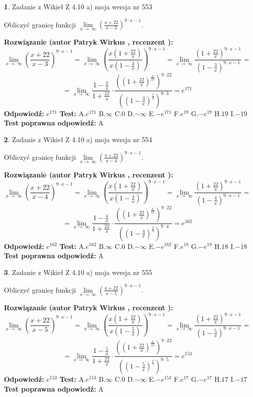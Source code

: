 \documentclass[12pt, a4paper]{article}
\theoremstyle{definition} %
\newtheorem{zad}{}
\newcommand{\zadStart}[1]{\begin{zad}#1\newline}
\newcommand{\zadStop}{\end{zad}}
\newcommand{\rozwStart}[2]{\noindent \textbf{Rozwiązanie (autor #1 , recenzent #2): }\newline}
\newcommand{\rozwStop}{\newline}
\newcommand{\odpStart}{\noindent \textbf{Odpowiedź:}\newline}
\newcommand{\odpStop}{\newline}
\newcommand{\testStart}{\noindent \textbf{Test:}\newline}
\newcommand{\testStop}{\newline}
\newcommand{\kluczStart}{\noindent \textbf{Test poprawna odpowiedź:}\newline}
\newcommand{\kluczStop}{\newline}
\begin{document}
\zadStart{Zadanie z Wikieł Z 4.10 a) moja wersja nr 553}

Obliczyć granicę funkcji  $\lim\limits_{x\to\ \infty}(\frac{x+22}{x-3})^{9\cdot x-1}$.
\zadStop
\rozwStart{Patryk Wirkus}{}
$$\lim\limits_{x\to\ \infty}(\frac{x+22}{x-3})^{9\cdot x-1} = \lim\limits_{x\to\ \infty}(\frac{x(1+\frac{22}{x})}{x(1-\frac{3}{x})})^{9\cdot x-1}=\lim\limits_{x\to\ \infty}\frac{(1+\frac{22}{x})^{9\cdot x-1}}{(1-\frac{3}{x})^{9\cdot x-1}}=$$
$$=\lim\limits_{x\to\ \infty}\frac{1-\frac{3}{x}}{1+\frac{22}{x}}\cdot\frac{((1+\frac{22}{x})^{\frac{x}{22}})^{9\cdot22}}{((1-\frac{3}{x})^{\frac{x}{3}})^{9\cdot3}}=e^{171}$$
\rozwStop
\odpStart
$e^{171}$
\odpStop
\testStart
A.$e^{171}$ B.$\infty$ C.$0$ D.$-\infty$ E.$-e^{171}$
F.$e^{19}$ G.$-e^{19}$
H.$19$
I.$-19$
\testStop
\kluczStart
A
\kluczStop



\zadStart{Zadanie z Wikieł Z 4.10 a) moja wersja nr 554}

Obliczyć granicę funkcji  $\lim\limits_{x\to\ \infty}(\frac{x+22}{x-4})^{9\cdot x-1}$.
\zadStop
\rozwStart{Patryk Wirkus}{}
$$\lim\limits_{x\to\ \infty}(\frac{x+22}{x-4})^{9\cdot x-1} = \lim\limits_{x\to\ \infty}(\frac{x(1+\frac{22}{x})}{x(1-\frac{4}{x})})^{9\cdot x-1}=\lim\limits_{x\to\ \infty}\frac{(1+\frac{22}{x})^{9\cdot x-1}}{(1-\frac{4}{x})^{9\cdot x-1}}=$$
$$=\lim\limits_{x\to\ \infty}\frac{1-\frac{4}{x}}{1+\frac{22}{x}}\cdot\frac{((1+\frac{22}{x})^{\frac{x}{22}})^{9\cdot22}}{((1-\frac{4}{x})^{\frac{x}{4}})^{9\cdot4}}=e^{162}$$
\rozwStop
\odpStart
$e^{162}$
\odpStop
\testStart
A.$e^{162}$ B.$\infty$ C.$0$ D.$-\infty$ E.$-e^{162}$
F.$e^{18}$ G.$-e^{18}$
H.$18$
I.$-18$
\testStop
\kluczStart
A
\kluczStop



\zadStart{Zadanie z Wikieł Z 4.10 a) moja wersja nr 555}

Obliczyć granicę funkcji  $\lim\limits_{x\to\ \infty}(\frac{x+22}{x-5})^{9\cdot x-1}$.
\zadStop
\rozwStart{Patryk Wirkus}{}
$$\lim\limits_{x\to\ \infty}(\frac{x+22}{x-5})^{9\cdot x-1} = \lim\limits_{x\to\ \infty}(\frac{x(1+\frac{22}{x})}{x(1-\frac{5}{x})})^{9\cdot x-1}=\lim\limits_{x\to\ \infty}\frac{(1+\frac{22}{x})^{9\cdot x-1}}{(1-\frac{5}{x})^{9\cdot x-1}}=$$
$$=\lim\limits_{x\to\ \infty}\frac{1-\frac{5}{x}}{1+\frac{22}{x}}\cdot\frac{((1+\frac{22}{x})^{\frac{x}{22}})^{9\cdot22}}{((1-\frac{5}{x})^{\frac{x}{5}})^{9\cdot5}}=e^{153}$$
\rozwStop
\odpStart
$e^{153}$
\odpStop
\testStart
A.$e^{153}$ B.$\infty$ C.$0$ D.$-\infty$ E.$-e^{153}$
F.$e^{17}$ G.$-e^{17}$
H.$17$
I.$-17$
\testStop
\kluczStart
A
\kluczStop
\end{document}
